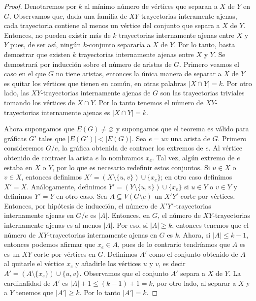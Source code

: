 \begin{proof}
    Denotaremos por $k$ al m\'inimo n\'umero de v\'ertices que separan a $X$ de
    $Y$ en $G$. Observamos que, dada una familia de $XY$-trayectorias
    interamente ajenas, cada trayectoria contiene al menos un v\'ertice del
    conjunto que separa a $X$ de $Y$. Entonces, no pueden existir m\'as de $k$
    trayectorias internamente ajenas entre $X$ y $Y$ pues, de ser as\'i,
    ning\'un $k$-conjunto separar\'ia a $X$ de $Y$. Por lo tanto, basta
    demostrar que existen $k$ trayectorias internamente ajenas entre $X$ y $Y$.
    Se demostrar\'a por inducci\'on sobre el n\'umero de aristas de $G$. Primero
    veamos el caso en el que $G$ no tiene aristas, entonces la \'unica manera de
    separar a $X$ de $Y$ es quitar los v\'ertices que tienen en com\'un, en
    otras palabras $|X \cap Y|=k$. Por otro lado, las $XY$-trayectorias
    internamente ajenas de $G$ son las trayectorias triviales tomando los
    v\'ertices de $X \cap Y$. Por lo tanto tenemos el n\'umero de
    $XY$-trayectorias internamente ajenas es $|X\cap Y|=k$.

    Ahora supongamos que $E(G) \neq \varnothing$ y supongamos que el teorema es
    v\'alido para gr\'aficas $G'$ tales que $|E(G')| < |E(G)|$. Sea $e = uv$ una
    arista de $G$. Primero consideremos $G/e$, la gr\'afica obtenida de contraer
    los extremos de $e$. Al v\'ertice obtenido de contraer la arista $e$ lo
    nombramos $x_e$. Tal vez, alg\'un extremo de $e$ estaba en $X$ o $Y$, por lo
    que es necesario redefinir estos conjuntos. Si $u\in X$ o $v\in X$, entonces
    definimos $X'=(X \setminus \{u,v\}) \cup \{x_e\}$; en otro caso definimos
    $X'=X$. An\'alogamente, definimos $Y'= (Y \setminus \{u,v\}) \cup \{x_e\}$
    si $u \in Y$ o $v \in Y$ y definimos $Y'=Y$ en otro caso. Sea $A \subseteq
    V(G \setminus e)$ un $X'Y'$-corte por v\'ertices. Entonces, por hip\'otesis
    de inducci\'on, el n\'umero de $X'Y'$-trayectorias internamente ajenas en
    $G/e$ es $|A|$. Entonces, en $G$, el n\'umero de $XY$-trayectorias
    internamente ajenas es al menos $|A|$. Por eso, si $|A| \geq k$, entonces
    tenemos que el n\'umero de $XY$-trayectorias internamente ajenas en $G$ es
    $k$. Ahora, si $|A| \leq k-1$, entonces podemos afirmar que $x_e \in A$,
    pues de lo contrario tendr\'iamos que $A$ es es un $XY$-corte por v\'ertices
    en $G$. Definimos $A'$ como el conjunto obtenido de $A$ al quitarle el
    v\'ertice $x_e$ y a\~{n}adirle los v\'ertices $u$ y $v$, es decir $A'=(A
    \setminus \{x_e\})\cup \{u,v\}$. Observamos que el conjunto $A'$ separa  a
    $X$ de $Y$. La cardinalidad de $A'$ es $|A|+1 \leq (k-1)+1= k$, por otro
    lado, al separar a $X$ y a $Y$ tenemos que $|A'| \geq k$. Por lo tanto
    $|A'|=k$.


\end{proof}
